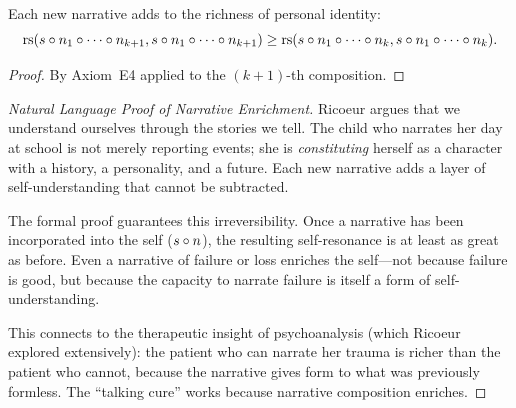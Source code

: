 \begin{theorem}
\label{thm:narrative-enriches}
Each new narrative adds to the richness of personal identity:
\[
\mathrm{rs}(s \circ n_1 \circ \cdots \circ n_{k+1}, s \circ n_1 \circ \cdots \circ n_{k+1})
\geq \mathrm{rs}(s \circ n_1 \circ \cdots \circ n_k, s \circ n_1 \circ \cdots \circ n_k).
\]
\end{theorem}

\begin{proof}
By Axiom~E4 applied to the $(k+1)$-th composition.
\end{proof}

\begin{proof}[Natural Language Proof of Narrative Enrichment]
Ricoeur argues that we understand ourselves through the stories we tell.
The child who narrates her day at school is not merely reporting events;
she is \emph{constituting} herself as a character with a history, a
personality, and a future.  Each new narrative adds a layer of
self-understanding that cannot be subtracted.

The formal proof guarantees this irreversibility.  Once a narrative has been
incorporated into the self ($s \circ n$), the resulting self-resonance
is at least as great as before.  Even a narrative of failure or loss
enriches the self---not because failure is good, but because the capacity
to narrate failure is itself a form of self-understanding.

This connects to the therapeutic insight of psychoanalysis (which Ricoeur
explored extensively): the patient who can narrate her trauma is richer
than the patient who cannot, because the narrative gives form to what was
previously formless.  The ``talking cure'' works because narrative
composition enriches.
\end{proof}

